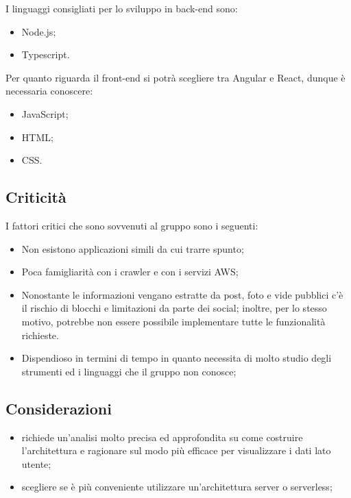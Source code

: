 \documentclass[12pt,a4paper]{article}
\begin{document}
		I linguaggi consigliati per lo sviluppo in back-end sono:
		\begin{itemize}
			\item Node.js;
			\item Typescript.
		\end{itemize}
		Per quanto riguarda il front-end si potrà scegliere tra Angular e React, dunque è necessaria conoscere:
		\begin{itemize}
			\item JavaScript;
			\item HTML;
			\item CSS.
		\end{itemize}

	\subsection{Criticità}
	I fattori critici che sono sovvenuti al gruppo sono i seguenti:
		\begin{itemize}
			\item Non esistono applicazioni simili da cui trarre spunto;
			\item Poca famigliarità con i crawler e con i servizi AWS;
			\item Nonostante le informazioni vengano estratte da post, foto e vide pubblici c'è il rischio di blocchi e limitazioni da parte dei social; inoltre, per lo stesso motivo, potrebbe non essere possibile implementare tutte le funzionalità richieste.
			\item Dispendioso in termini di tempo in quanto necessita di molto studio degli strumenti ed i linguaggi che il gruppo non conosce;
		\end{itemize}

	\subsection{Considerazioni}
	\begin{itemize}
		\item richiede un'analisi molto precisa ed approfondita su come costruire l'architettura e ragionare sul modo più efficace per visualizzare i dati lato utente;
		\item scegliere se è più conveniente utilizzare un'architettura server o serverless;
	\end{itemize}
\end{document}
